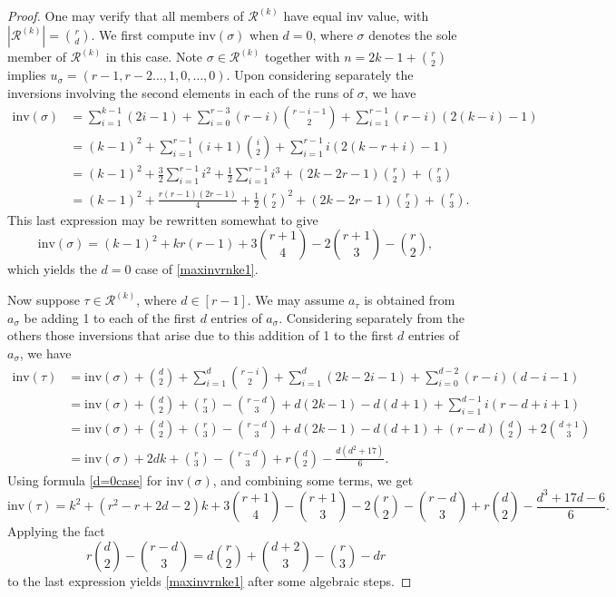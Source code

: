 \documentclass[11pt,a4paper]{article}
\begin{document}
\begin{proof}
One may verify that all members of $\mathcal{R}^{(k)}$ have equal inv value, with $|\mathcal{R}^{(k)}|=\binom{r}{d}$.  We first compute $\text{inv}(\sigma)$ when $d=0$, where $\sigma$ denotes the sole member of $\mathcal{R}^{(k)}$ in this case.  Note $\sigma \in \mathcal{R}^{(k)}$ together with  $n=2k-1+\binom{r}{2}$  implies $u_\sigma=(r-1,r-2\ldots,1,0,\ldots,0)$.  Upon considering separately the inversions involving the second elements in each of the runs of $\sigma$, we have
\begin{align*}
\text{inv}(\sigma)&=\sum_{i=1}^{k-1}(2i-1)+\sum_{i=0}^{r-3}(r-i)\binom{r-i-1}{2}+\sum_{i=1}^{r-1}(r-i)(2(k-i)-1)\\
&=(k-1)^2+\sum_{i=1}^{r-1}(i+1)\binom{i}{2}+\sum_{i=1}^{r-1}i(2(k-r+i)-1)\\
&=(k-1)^2+\frac{3}{2}\sum_{i=1}^{r-1}i^2+\frac{1}{2}\sum_{i=1}^{r-1}i^3 +(2k-2r-1)\binom{r}{2}+\binom{r}{3}\\
&=(k-1)^2+\frac{r(r-1)(2r-1)}{4}+\frac{1}{2}\binom{r}{2}^2+(2k-2r-1)\binom{r}{2}+\binom{r}{3}.
\end{align*}
This last expression may be rewritten somewhat to give
\begin{equation}\label{d=0case}
\text{inv}(\sigma)=(k-1)^2+kr(r-1)+3\binom{r+1}{4}-2\binom{r+1}{3}-\binom{r}{2},
\end{equation}
which yields the $d=0$ case of \eqref{maxinvrnke1}.

Now suppose $\tau \in \mathcal{R}^{(k)}$, where $d \in [r-1]$.  We may assume $a_\tau$ is obtained from $a_\sigma$ be adding 1 to each of the first $d$ entries of $a_\sigma$. Considering separately from the others those inversions that arise due to this addition of 1 to the first $d$ entries of $a_\sigma$, we have
\begin{align*}
\text{inv}(\tau)&=\text{inv}(\sigma)+\binom{d}{2}+\sum_{i=1}^d\binom{r-i}{2}+\sum_{i=1}^d(2k-2i-1)+\sum_{i=0}^{d-2}(r-i)(d-i-1)\\
&=\text{inv}(\sigma)+\binom{d}{2}+\binom{r}{3}-\binom{r-d}{3}+d(2k-1)-d(d+1)+\sum_{i=1}^{d-1}i(r-d+i+1)\\
&=\text{inv}(\sigma)+\binom{d}{2}+\binom{r}{3}-\binom{r-d}{3}+d(2k-1)-d(d+1)+(r-d)\binom{d}{2}+2\binom{d+1}{3}\\
&=\text{inv}(\sigma)+2dk+\binom{r}{3}-\binom{r-d}{3}+r\binom{d}{2}-\frac{d(d^2+17)}{6}.
\end{align*}
Using formula \eqref{d=0case} for $\text{inv}(\sigma)$, and combining some terms, we get
$$\text{inv}(\tau)=k^2+(r^2-r+2d-2)k+3\binom{r+1}{4}-\binom{r+1}{3}-2\binom{r}{2}-\binom{r-d}{3}+r\binom{d}{2}-\frac{d^3+17d-6}{6}.$$
Applying the fact
$$r\binom{d}{2}-\binom{r-d}{3}=d\binom{r}{2}+\binom{d+2}{3}-\binom{r}{3}-dr$$
to the last expression yields \eqref{maxinvrnke1} after some algebraic steps.


\end{proof}
\end{document}
